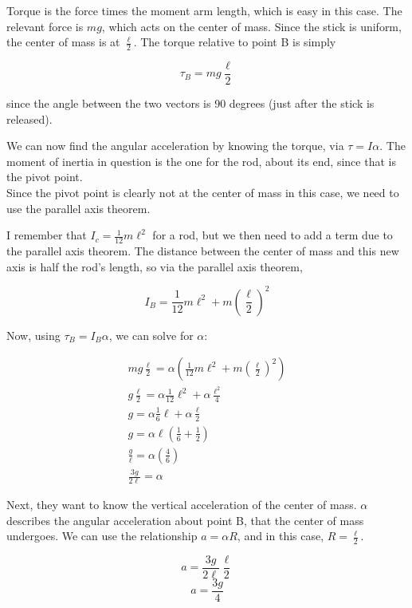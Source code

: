 \documentclass[12pt,a4paper]{report}
\begin{document}
Torque is the force times the moment arm length, which is easy in this case. The relevant force is $m g$, which acts on the center of mass. Since the stick is uniform, the center of mass is at $\frac{\ell}{2}$. The torque relative to point B is simply

\begin{equation}
\tau_B = m g \frac{\ell}{2}
\end{equation}

since the angle between the two vectors is 90 degrees (just after the stick is released).

We can now find the angular acceleration by knowing the torque, via $\tau = I \alpha$. The moment of inertia in question is the one for the rod, about its end, since that is the pivot point.\\
Since the pivot point is clearly not at the center of mass in this case, we need to use the parallel axis theorem.

I remember that $I_c = \frac{1}{12} m \ell^2$ for a rod, but we then need to add a term due to the parallel axis theorem. The distance between the center of mass and this new axis is half the rod's length, so via the parallel axis theorem,

\begin{equation}
I_B = \frac{1}{12} m \ell^2 + m \left(\frac{\ell}{2}\right)^2
\end{equation}

Now, using $\tau_B = I_B \alpha$, we can solve for $\alpha$:

\begin{align}
m g \frac{\ell}{2} = \alpha\left( \frac{1}{12} m \ell^2 + m \left(\frac{\ell}{2}\right)^2 \right)\\
g \frac{\ell}{2} = \alpha \frac{1}{12} \ell^2 + \alpha \frac{\ell^2}{4}\\
g = \alpha \frac{1}{6} \ell + \alpha \frac{\ell}{2}\\
g = \alpha\ell \left( \frac{1}{6} + \frac{1}{2}\right)\\
\frac{g}{\ell} = \alpha \left( \frac{4}{6}\right)\\
\frac{3g}{2\ell} = \alpha
\end{align}

Next, they want to know the vertical acceleration of the center of mass. $\alpha$ describes the angular acceleration about point B, that the center of mass undergoes. We can use the relationship $a = \alpha R$, and in this case, $R = \frac{\ell}{2}$.

\begin{equation}
a = \frac{3g}{2\ell} \frac{\ell}{2}
\end{equation}
\begin{equation}
a = \frac{3g}{4}
\end{equation}
\end{document}
